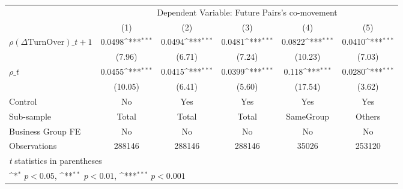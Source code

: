 {
\def\sym#1{\ifmmode^{#1}\else\(^{#1}\)\fi}
\begin{tabular}{l*{5}{c}}
\hline\hline
                &\multicolumn{5}{c}{Dependent Variable:  Future Pairs's co-movement}                           \\\cmidrule(lr){2-6}
                &\multicolumn{1}{c}{(1)}         &\multicolumn{1}{c}{(2)}         &\multicolumn{1}{c}{(3)}         &\multicolumn{1}{c}{(4)}         &\multicolumn{1}{c}{(5)}         \\
\hline
 $ {\rho(\Delta \text{TurnOver})\_{t+1}} $ &   0.0498\sym{***}&   0.0494\sym{***}&   0.0481\sym{***}&   0.0822\sym{***}&   0.0410\sym{***}\\
                &   (7.96)         &   (6.71)         &   (7.24)         &  (10.23)         &   (7.03)         \\
[1em]
 $ {\rho\_t} $   &   0.0455\sym{***}&   0.0415\sym{***}&   0.0399\sym{***}&    0.118\sym{***}&   0.0280\sym{***}\\
                &  (10.05)         &   (6.41)         &   (5.60)         &  (17.54)         &   (3.62)         \\
\hline
Control         &       No         &      Yes         &      Yes         &      Yes         &      Yes         \\
Sub-sample      &    Total         &    Total         &    Total         &SameGroup         &   Others         \\
Business Group FE&       No         &       No         &       No         &       No         &       No         \\
Observations    &   288146         &   288146         &   288146         &    35026         &   253120         \\
\hline\hline
\multicolumn{6}{l}{\footnotesize \textit{t} statistics in parentheses}\\
\multicolumn{6}{l}{\footnotesize \sym{*} \(p<0.05\), \sym{**} \(p<0.01\), \sym{***} \(p<0.001\)}\\
\end{tabular}
}
